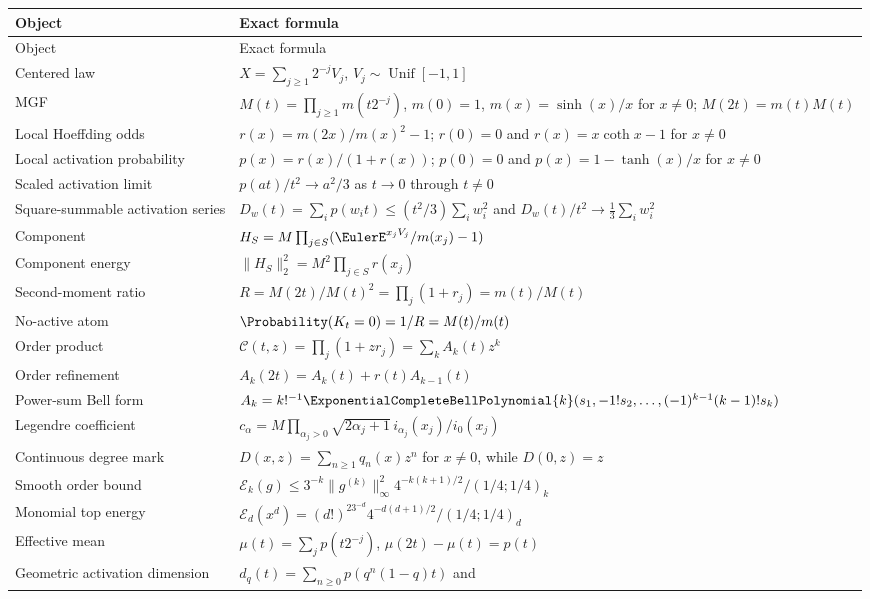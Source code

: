 \documentclass[11pt,oneside]{article}
\theoremstyle{definition}
\theoremstyle{remark}
\newcommand{\Ccal}{\mathcal C}
\newcommand{\Ecal}{\mathcal E}
\newcommand{\InteractionPowerSum}[1]{s_{#1}}
\begin{document}
\begin{longtable}{@{}p{}p{}@{}}
\toprule
Object & Exact formula \\
\midrule
\endfirsthead
\toprule
Object & Exact formula \\
\midrule
\endhead
Centered law
& $X=\sum_{j\ge1}2^{-j}V_j$, $V_j\sim\operatorname{Unif}[-1,1]$ \\
MGF
& $M(t)=\prod_{j\ge1}m(t2^{-j})$, $m(0)=1$, $m(x)=\sinh(x)/x$ for $x\ne0$;
$M(2t)=m(t)M(t)$ \\
Local Hoeffding odds
& $r(x)=m(2x)/m(x)^2-1$; $r(0)=0$ and $r(x)=x\coth x-1$ for $x\ne0$ \\
Local activation probability
& $p(x)=r(x)/(1+r(x))$; $p(0)=0$ and $p(x)=1-\tanh(x)/x$ for $x\ne0$ \\
Scaled activation limit
& $p(at)/t^2\to a^2/3$ as $t\to0$ through $t\ne0$ \\
Square-summable activation series
& $D_w(t)=\sum_i p(w_it)\le(t^2/3)\sum_iw_i^2$ and
$D_w(t)/t^2\to\frac13\sum_iw_i^2$ \\
Component
& $H_S=M\prod_{j\in S}(\EulerE^{x_jV_j}/m(x_j)-1)$ \\
Component energy
& $\|H_S\|_2^2=M^2\prod_{j\in S}r(x_j)$ \\
Second-moment ratio
& $R=M(2t)/M(t)^2=\prod_j(1+r_j)=m(t)/M(t)$ \\
No-active atom
& $\Probability(K_t=0)=1/R=M(t)/m(t)$ \\
Order product
& $\Ccal(t,z)=\prod_j(1+zr_j)=\sum_kA_k(t)z^k$ \\
Order refinement
& $A_k(2t)=A_k(t)+r(t)A_{k-1}(t)$ \\
Power-sum Bell form
& $A_k=k!^{-1}\ExponentialCompleteBellPolynomial{k}(\InteractionPowerSum{1},-1!\InteractionPowerSum{2},\ldots,(-1)^{k-1}(k-1)!\InteractionPowerSum{k})$ \\
Legendre coefficient
& $c_\alpha=M\prod_{\alpha_j>0}\sqrt{2\alpha_j+1}\,i_{\alpha_j}(x_j)/i_0(x_j)$ \\
Continuous degree mark
& $D(x,z)=\sum_{n\ge1}q_n(x)z^n$ for $x\ne0$, while $D(0,z)=z$ \\
Smooth order bound
& $\Ecal_k(g)\le3^{-k}\|g^{(k)}\|_\infty^2
4^{-k(k+1)/2}/(1/4;1/4)_k$ \\
Monomial top energy
& $\Ecal_d(x^d)=(d!)^23^{-d}4^{-d(d+1)/2}/(1/4;1/4)_d$ \\
Effective mean
& $\mu(t)=\sum_jp(t2^{-j})$, $\mu(2t)-\mu(t)=p(t)$ \\
Geometric activation dimension
& $d_q(t)=\sum_{n\ge0}p(q^n(1-q)t)$ and

\end{longtable}
\end{document}

